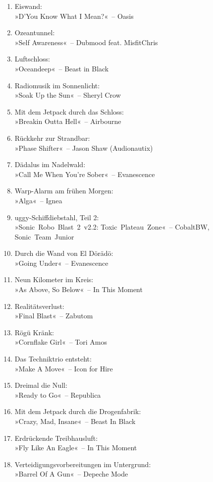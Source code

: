 \begin{enumerate}
    \item Eiswand:\\ »D’You Know What I Mean?«~– Oasis
    \item Ozeantunnel:\\ »Self Awareness«~– Dubmood feat. MisfitChris
    \item Luftschloss:\\ »Oceandeep«~– Beast in Black
    \item Radiomusik im Sonnenlicht:\\ »Soak Up the Sun«~– Sheryl Crow
    \item Mit dem Jetpack durch das Schloss:\\ »Breakin Outta Hell«~– Airbourne
    \item Rückkehr zur Strandbar:\\ »Phase Shifter«~– Jason Shaw (Audionautix)
    \item Dädalus im Nadelwald:\\ »Call Me When You’re Sober«~– Evanescence
    \item Warp-Alarm am frühen Morgen:\\ »Alga«~– Ignea
    \item uggy-Schiffdiebstahl, Teil 2:\\ »Sonic~Robo~Blast~2~v2.2: Toxic~Plateau~Zone«~– CobaltBW, Sonic~Team~Junior
    \item Durch die Wand von El Dörädö:\\ »Going Under«~– Evanescence
    \item Neun Kilometer im Kreis:\\ »As Above, So Below«~– In This Moment
    \item Realitätsverlust:\\ »Final Blast«~– Zabutom
    \item Rögü Kränk:\\ »Cornflake Girl«~– Tori Amos
    \item Das Techniktrio entsteht:\\ »Make A Move«~– Icon for Hire
    \item Dreimal die Null:\\ »Ready to Go«~– Republica
    \item Mit dem Jetpack durch die Drogenfabrik:\\ »Crazy, Mad, Insane«~– Beast In Black
    \item Erdrückende Treibhausluft:\\ »Fly Like An Eagle«~– In This Moment
    \item Verteidigungsvorbereitungen im Untergrund:\\ »Barrel Of A Gun«~– Depeche Mode

\end{enumerate}
